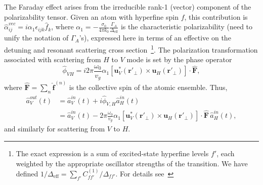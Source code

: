 \documentclass[aps,pra,twocolumn,superscriptaddress]{revtex4-1} %
\newcommand{\nn}{\nonumber}
\newcommand{\mbf}[1]{\mathbf{#1}}
\newcommand{\eff}{\text{eff}}
\newcommand{\comment}[1]{{\color{Maroon} #1}}
\begin{document}
The Faraday effect arises from the irreducible rank-1 (vector) component of the polarizability tensor.  Given an atom with hyperfine spin $f$, this contribution is $\hat{\alpha}^{vec}_{ij} = i \alpha_1 \epsilon_{ijk} \hat{f}_k$, where $\alpha_1 = -\frac{\sigma_0}{4\pi k_0 }\frac{\Gamma_A}{\Delta_{\eff}} $ is the characteristic polarizability \comment{(need to unify the notation of $ \Gamma_A $'s)}, expressed here in terms of an effective on the detuning and resonant scattering cross section~\footnote{The exact expression is a sum of excited-state hyperfine levels $f'$, each weighted by the appropriate oscillator strengths of the transition.  We have defined $1/\Delta_{\eff} = \sum_{f'} C^{(1)}_{ff'}/\Delta_{ff'}$. For details see~\cite{Qi2016}}.   The polarization transformation associated with scattering from $H$ to $V$ mode is set by the phase operator
\begin{equation}
\hat{\phi}_{VH} = i 2\pi \frac{\omega_0}{v_g}\alpha_1 \left[ \mbf{u}^*_V (\mbf{r}'_\perp) \times  \mbf{u}_{H} (\mbf{r}'_\perp) \right] \cdot \hat{\mbf{F}},
\end{equation}
where $\hat{\mbf{F}}=\sum_n \hat{\mbf{f}}^{(n)}$ is the collective spin of the atomic ensemble.  Thus,
\begin{align}
\hat{a}^{out}_V(t) &= \hat{a}^{in}_V(t)  +i  \hat{\phi}_{V,H} \hat{a}^{in}_{H}(t)\nn\\
&= \hat{a}^{in}_V(t) \!-\! 2\pi\! \frac{\omega_0}{v_g}\alpha_1\! \left[ \mbf{u}^*_V (\!\mbf{r}'_\perp\!) \!\!\times\!\!  \mbf{u}_{H}(\!\mbf{r}'_\perp\!)\right]  \!\cdot\! \hat{\mbf{F}}\, \hat{a}^{in}_{H}(t),\label{eq:aoutain}
\end{align}
 and similarly for scattering from $V$ to $H$.
\end{document}
